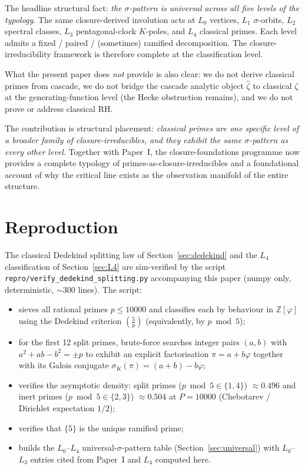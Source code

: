\documentclass[11pt,a4paper]{article}
\theoremstyle{definition}
\theoremstyle{remark}
\begin{document}
The headline structural fact: \emph{the $\sigma$-pattern is universal
across all five levels of the typology}. The same closure-derived
involution acts at $L_0$ vertices, $L_1$ $\sigma$-orbits, $L_2$ spectral
classes, $L_3$ pentagonal-clock $K$-poles, and $L_4$ classical primes.
Each level admits a fixed / paired / (sometimes) ramified decomposition.
The closure-irreducibility framework is therefore complete at the
classification level.

What the present paper does \emph{not} provide is also clear: we do not
derive classical primes from cascade, we do not bridge the cascade
analytic object $\hat{\zeta}$ to classical $\zeta$ at the generating-function
level (the Hecke obstruction remains), and we do not prove or address
classical RH.

The contribution is structural placement: \emph{classical primes are one
specific level of a broader family of closure-irreducibles, and they
exhibit the same $\sigma$-pattern as every other level}. Together with
Paper~I, the closure-foundations programme now provides a complete
typology of primes-as-closure-irreducibles and a foundational account of
why the critical line exists as the observation manifold of the entire
structure.

\section{Reproduction}\label{sec:reproduction}

The classical Dedekind splitting law of Section~\ref{sec:dedekind}
and the $L_4$ classification of Section~\ref{sec:L4} are sim-verified
by the script \texttt{repro/verify\_dedekind\_splitting.py} accompanying
this paper (numpy only, deterministic, $\sim$300 lines). The script:
\begin{itemize}
\item sieves all rational primes $p \leq 10000$ and classifies each
      by behaviour in $\mathbb{Z}[\varphi]$ using the Dedekind criterion
      $\left(\tfrac{5}{p}\right)$ (equivalently, by $p \bmod 5$);
\item for the first 12 split primes, brute-force searches integer
      pairs $(a,b)$ with $a^2 + ab - b^2 = \pm p$ to exhibit an
      explicit factorisation $\pi = a + b\varphi$ together with its
      Galois conjugate $\sigma_K(\pi) = (a+b) - b\varphi$;
\item verifies the asymptotic density: split primes ($p \bmod 5 \in
      \{1,4\}$) $\approx 0.496$ and inert primes ($p \bmod 5 \in
      \{2,3\}$) $\approx 0.504$ at $P = 10000$ (Chebotarev / Dirichlet
      expectation $1/2$);
\item verifies that $\{5\}$ is the unique ramified prime;
\item builds the $L_0$--$L_4$ universal-$\sigma$-pattern table
      (Section~\ref{sec:universal}) with $L_0$--$L_3$ entries cited
      from Paper~I \cite{CriticalLinePaperI} and $L_4$ computed here.
\end{itemize}
\end{document}
